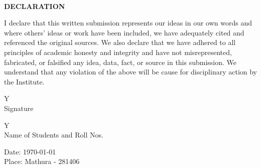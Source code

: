 \newpage
\begin{center}
    \\
    \vspace{0.8cm}
    \large
    \textbf{DECLARATION}
\end{center}

\begin{justify}
I declare that this written submission represents our ideas in our own words and where others' ideas or work have been included, we have adequately cited and referenced the original sources. We also declare that we have adhered to all principles of academic honesty and integrity and have not misrepresented, fabricated, or falsified any idea, data, fact, or source in this submission. We understand that any violation of the above will be cause for disciplinary action by the Institute.
\end{justify}

\vspace{0.6cm}
\begin{table}[H]
\begin{flushright}
\begin{tabular}{Y}
\hrulefill\\
\large Signature
\end{tabular}
\end{flushright}
\end{table}

\begin{table}[H]
\begin{flushright}
\begin{tabular}{Y}
\hrulefill\\
\large Name of Students and Roll Nos.
\end{tabular}
\end{flushright}
\end{table}

\begin{flushleft}
{\large Date: {\today}}\\
{\large Place: Mathura - 281406}
\end{flushleft}
